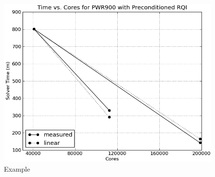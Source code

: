 \documentclass[preprint,12pt]{elsarticle}
\begin{document}

\clearpage

\begin{figure}[p]
  \begin{center}
    \includegraphics[width=6in,clip]{PWRPrecondRQI}
  \end{center}
  \caption{Example}
  \label{fig:example2}
\end{figure}


\clearpage
\end{document}
